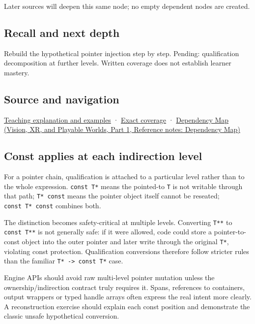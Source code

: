 Later sources will deepen this same node; no empty dependent nodes are created.

\subsection{Recall and next depth}\label{appendix-5e1a7561cd98-recall-and-next-depth}

\hypertarget{appendix-5e1a7561cd98-recall-and-next-depth}{}

Rebuild the hypothetical pointer injection step by step. Pending: qualification decomposition at further levels. Written coverage does not establish learner mastery.

\subsection{Source and navigation}\label{appendix-5e1a7561cd98-source-and-navigation}

\hypertarget{appendix-5e1a7561cd98-source-and-navigation}{}

\hyperref[01-foundations-i-ch003-read-only-is-a-path-not-an-ownership-or-synchronization-promise]{Teaching explanation and examples} · \hyperref[appendix-fd090d982a15-m008---parts-113-126]{Exact coverage} · \href{../07-Vision-XR-and-Playable-Worlds-P01/main.pdf\#nameddest=appendix-4ad47bdd269a}{Dependency Map (Vision, XR, and Playable Worlds, Part 1, Reference notes: Dependency Map)}

\subsection{Const applies at each indirection level}\label{appendix-5e1a7561cd98-const-applies-at-each-indirection-level}

\hypertarget{appendix-5e1a7561cd98-const-applies-at-each-indirection-level}{}

For a pointer chain, qualification is attached to a particular level rather than to the whole expression. \texttt{const\ T*} means the pointed-to \texttt{T} is not writable through that path; \texttt{T*\ const} means the pointer object itself cannot be reseated; \texttt{const\ T*\ const} combines both.

The distinction becomes safety-critical at multiple levels. Converting \texttt{T**} to \texttt{const\ T**} is not generally safe: if it were allowed, code could store a pointer-to-const object into the outer pointer and later write through the original \texttt{T*}, violating const protection. Qualification conversions therefore follow stricter rules than the familiar \texttt{T*\ -\textgreater{}\ const\ T*} case.

Engine APIs should avoid raw multi-level pointer mutation unless the ownership/indirection contract truly requires it. Spans, references to containers, output wrappers or typed handle arrays often express the real intent more clearly. A reconstruction exercise should explain each const position and demonstrate the classic unsafe hypothetical conversion.
